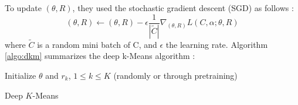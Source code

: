To update $(\theta, R)$, they used the stochastic gradient descent (SGD)
as follows :
\begin{equation}
  (\theta, R) \gets (\theta, R) - \epsilon \frac{1}{|\widetilde{C}|}
  \nabla_{(\theta, R)} L(C, \alpha; \theta, R)
\end{equation}
where $\widetilde{C}$ is a random mini batch of C, and $\epsilon$ the
learning rate.
Algorithm \ref{algo:dkm} summarizes the deep k-Means algorithm :
\begin{algorithm}[!h]
  Initialize $\theta$ and $r_k$, $1 \leq k \leq K$ (randomly or through 
  pretraining)\\
  \caption{\label{algo:dkm}Deep $K$-Means}
\end{algorithm}
